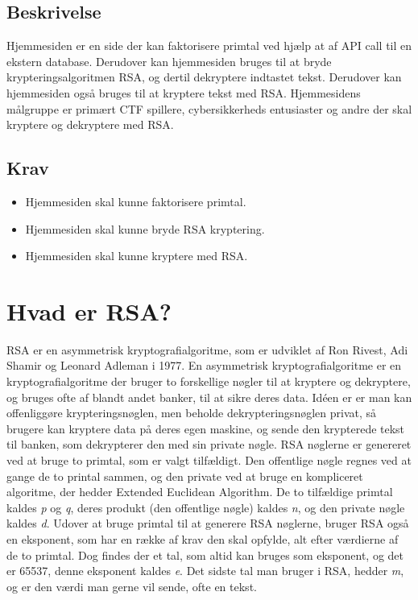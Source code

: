 \documentclass{article}
\begin{document}
    \subsection{Beskrivelse}\label{subsec:beskrivelse}
    Hjemmesiden er en side der kan faktorisere primtal ved hjælp at af API call til en ekstern database.
    Derudover kan hjemmesiden bruges til at bryde krypteringsalgoritmen RSA, og dertil dekryptere indtastet tekst.
    Derudover kan hjemmesiden også bruges til at kryptere tekst med RSA. Hjemmesidens målgruppe er primært CTF
    spillere, cybersikkerheds entusiaster og andre der skal kryptere og dekryptere med RSA.

    \subsection{Krav}\label{subsec:krav}
    \begin{itemize}
        \item Hjemmesiden skal kunne faktorisere primtal.
        \item Hjemmesiden skal kunne bryde RSA kryptering.
        \item Hjemmesiden skal kunne kryptere med RSA.
    \end{itemize}


    \section{Hvad er RSA?}\label{sec:hvad-er-rsa}
    RSA er en asymmetrisk kryptografialgoritme, som er udviklet af Ron Rivest, Adi Shamir og Leonard Adleman i 1977.
    En asymmetrisk kryptografialgoritme er en kryptografialgoritme der bruger to forskellige nøgler til at kryptere og dekryptere,
    og bruges ofte af blandt andet banker, til at sikre deres data.
    Idéen er er man kan offenliggøre krypteringsnøglen, men beholde dekrypteringsnøglen privat, så brugere kan kryptere data på deres egen maskine,
    og sende den krypterede tekst til banken, som dekrypterer den med sin private nøgle.
    RSA nøglerne er genereret ved at bruge to primtal, som er valgt tilfældigt.
    Den offentlige nøgle regnes ved at gange de to printal sammen, og den private ved at bruge en kompliceret algoritme,
    der hedder Extended Euclidean Algorithm.
    De to tilfældige primtal kaldes \emph{p} og \emph{q}, deres produkt (den offentlige nøgle) kaldes \emph{n}, og den private nøgle kaldes \emph{d}.
    Udover at bruge primtal til at generere RSA nøglerne, bruger RSA også en eksponent, som har en række af krav den skal opfylde,
    alt efter værdierne af de to primtal.
    Dog findes der et tal, som altid kan bruges som eksponent, og det er 65537, denne eksponent kaldes \emph{e}.
    Det sidste tal man bruger i RSA, hedder \emph{m}, og er den værdi man gerne vil sende, ofte en tekst.
\end{document}
